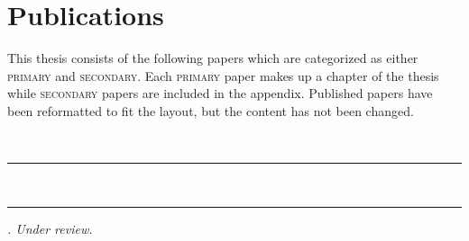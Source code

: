 \chapter[publications]{Publications}

This thesis consists of the following papers which are categorized as either \textsc{primary} and \textsc{secondary}. 
Each \textsc{primary} paper makes up a chapter of the thesis while \textsc{secondary} papers are included in the appendix. 
Published papers have been reformatted to fit the layout, but the content has not been changed. 

\vspace{5mm}

\raggedright\par\noindent\hspace{8mm}{\large\scshape primary}\\[-2mm]

\raggedleft\rule{\textwidth - 8mm}{0.4pt}

\begin{enumerate}[leftmargin=8mm,topsep=0mm,label={[\Alph*]}]

    \item {}
    \item {} 

\end{enumerate}

\vspace{5mm}

\raggedright\par\noindent\hspace{8mm}{\large\scshape secondary}\\[-2mm]

\raggedleft\rule{\textwidth - 8mm}{0.4pt}

\begin{enumerate}[leftmargin=8mm,topsep=0mm,label={[\Alph*]}]
    \setcounter{enumi}{2}

    \item {}
    \item {}
    \item {}
    \item {} \textit{. Under review.}
    \item {}
    \item {}

\end{enumerate}


\justifying

\vspace*{\fill}
